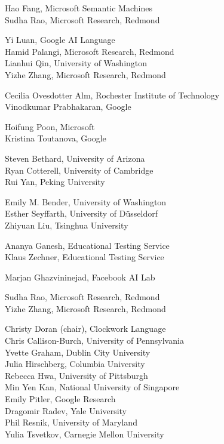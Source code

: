Hao Fang, Microsoft Semantic Machines\\
Sudha Rao, Microsoft Research, Redmond 

Yi Luan, Google AI Language\\
Hamid Palangi, Microsoft Research, Redmond\\
Lianhui Qin, University of Washington\\
Yizhe Zhang, Microsoft Research, Redmond

Cecilia Ovesdotter Alm, Rochester Institute of Technology\\
Vinodkumar Prabhakaran, Google

Hoifung Poon, Microsoft\\
Kristina Toutanova, Google

Steven Bethard, University of Arizona\\
Ryan Cotterell, University of Cambridge\\
Rui Yan, Peking University

Emily M. Bender, University of Washington\\
Esther Seyffarth, University of D\"{u}sseldorf\\
Zhiyuan Liu, Tsinghua University 

Ananya Ganesh, Educational Testing Service\\
Klaus Zechner, Educational Testing Service

Marjan Ghazvininejad, Facebook AI Lab

Sudha Rao, Microsoft Research, Redmond\\
Yizhe Zhang, Microsoft Research, Redmond

Christy Doran (chair), Clockwork Language\\
Chris Callison-Burch, University of Pennsylvania\\
Yvette Graham, Dublin City University\\
Julia Hirschberg, Columbia University\\
Rebecca Hwa, University of Pittsburgh\\
Min Yen Kan, National University of Singapore\\
Emily Pitler, Google Research\\
Dragomir Radev, Yale University\\
Phil Resnik, University of Maryland\\
Yulia Tsvetkov, Carnegie Mellon University

